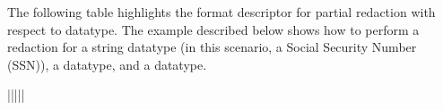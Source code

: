 \documentclass[letterpaper,10pt,english,openany,oneside]{sphinxmanual}
\begin{document}
The following table highlights the format descriptor for partial
redaction with respect to datatype. The example described below shows
how to perform a redaction for a string datatype (in this scenario, a
Social Security Number (SSN)), a  datatype, and a  datatype.

\newpage


\begin{savenotes}\sphinxatlongtablestart\begin{longtable}{|||||}
\hline

\endfirsthead

%
{}\\
\hline

\endhead

\hline
{}\\
\endfoot

\endlastfoot


\end{longtable}
\end{savenotes}
\end{document}
